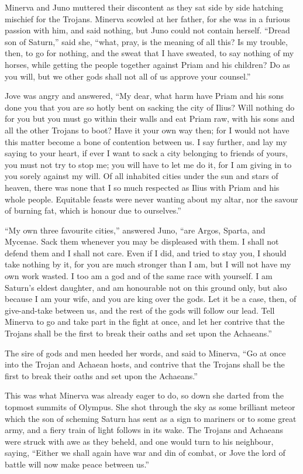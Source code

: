 Minerva and Juno muttered their discontent as they sat side by side
hatching mischief for the Trojans. Minerva scowled at her father, for she
was in a furious passion with him, and said nothing, but Juno could not
contain herself. “Dread son of Saturn,” said she, “what, pray, is the
meaning of all this? Is my trouble, then, to go for nothing, and the sweat
that I have sweated, to say nothing of my horses, while getting the people
together against Priam and his children? Do as you will, but we other gods
shall not all of us approve your counsel.”

Jove was angry and answered, “My dear, what harm have Priam and his sons
done you that you are so hotly bent on sacking the city of Ilius? Will
nothing do for you but you must go within their walls and eat Priam raw, with
his sons and all the other Trojans to boot? Have it your own way then; for
I would not have this matter become a bone of contention between us. I say
further, and lay my saying to your heart, if ever I want to sack a city
belonging to friends of yours, you must not try to stop me; you will have
to let me do it, for I am giving in to you sorely against my will. Of all
inhabited cities under the sun and stars of heaven, there was none that I
so much respected as Ilius with Priam and his whole people. Equitable
feasts were never wanting about my altar, nor the savour of burning fat,
which is honour due to ourselves.”

“My own three favourite cities,” answered Juno, “are Argos, Sparta, and
Mycenae. Sack them whenever you may be displeased with them. I shall not
defend them and I shall not care. Even if I did, and tried to stay you, I
should take nothing by it, for you are much stronger than I am, but I will
not have my own work wasted. I too am a god and of the same race with
yourself. I am Saturn’s eldest daughter, and am honourable not on this
ground only, but also because I am your wife, and you are king over the
gods. Let it be a case, then, of give-and-take between us, and the rest of
the gods will follow our lead. Tell Minerva to go and take part in the
fight at once, and let her contrive that the Trojans shall be the first to
break their oaths and set upon the Achaeans.”

The sire of gods and men heeded her words, and said to Minerva, “Go at
once into the Trojan and Achaean hosts, and contrive that the Trojans
shall be the first to break their oaths and set upon the Achaeans.”

This was what Minerva was already eager to do, so down she darted from the
topmost summits of Olympus. She shot through the sky as some brilliant
meteor which the son of scheming Saturn has sent as a sign to mariners or
to some great army, and a fiery train of light follows in its wake. The
Trojans and Achaeans were struck with awe as they beheld, and one would
turn to his neighbour, saying, “Either we shall again have war and din of
combat, or Jove the lord of battle will now make peace between us.”


